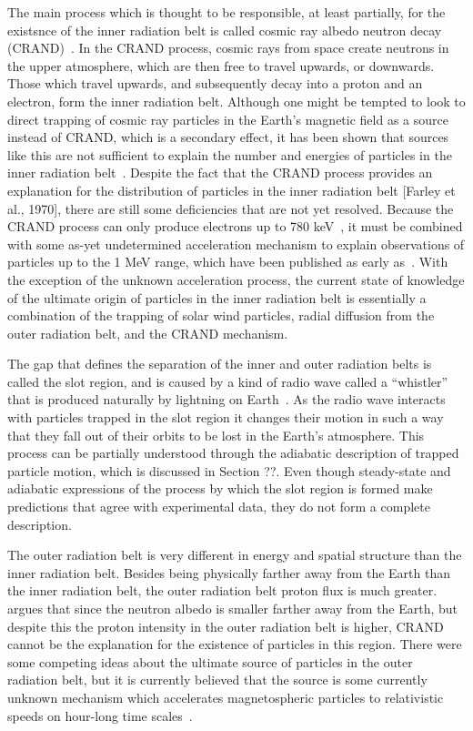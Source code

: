 The main process which is thought to be responsible, at least partially, for the existsnce of the inner radiation belt is called cosmic ray albedo neutron decay (CRAND)~\citep{singer1958}. In the CRAND process, cosmic rays from space create neutrons in the upper atmosphere, which are then free to travel upwards, or downwards. Those which travel upwards, and subsequently decay into a proton and an electron, form the inner radiation belt. Although one might be tempted to look to direct trapping of cosmic ray particles in the Earth’s magnetic field as a source instead of CRAND, which is a secondary effect, it has been shown that sources like this are not sufficient to explain the number and energies of particles in the inner radiation belt~\citet{hess1960}. 
Despite the fact that the CRAND process provides an explanation for the distribution of particles in the inner radiation belt [Farley et al., 1970], there are still some deficiencies that are not yet resolved. Because the CRAND process can only produce electrons up to 780 keV~\citet{baker2012}, it must be combined with some as-yet undetermined acceleration mechanism to explain observations of particles up to the 1 MeV range, which have been published as early as~\cite{hess1962}. With the exception of the unknown acceleration process, the current state of knowledge of the ultimate origin of particles in the inner radiation belt is essentially a combination of the trapping of solar wind particles, radial diffusion from the outer radiation belt, and the CRAND mechanism.

The gap that defines the separation of the inner and outer radiation belts is called the slot region, and is caused by a kind of radio wave called a “whistler” that is produced naturally by lightning on Earth~\citet{thorne1973}. As the radio wave interacts with particles trapped in the slot region it changes their motion in such a way that they fall out of their orbits to be lost in the Earth’s atmosphere. This process can be partially understood through the adiabatic description of trapped particle motion, which is discussed in Section ??. Even though steady-state and adiabatic expressions of the process by which the slot region is formed make predictions that agree with experimental data, they do not form a complete description. 

The outer radiation belt is very different in energy and spatial structure than the inner radiation belt. Besides being physically farther away from the Earth than the inner radiation belt, the outer radiation belt proton flux is much greater.\cite{hess1965} argues that since the neutron albedo is smaller farther away from the Earth, but despite this the proton intensity in the outer radiation belt is higher, CRAND cannot be the explanation for the existence of particles in this region. There were some competing ideas about the ultimate source of particles in the outer radiation belt, but it is currently believed that the source is some currently unknown mechanism which accelerates magnetospheric particles to relativistic speeds on hour-long time scales~\citet{baker2012}.

